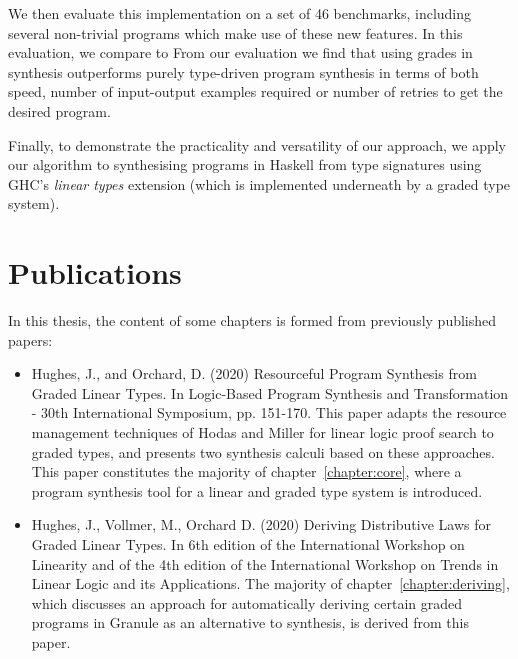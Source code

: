 We then evaluate this implementation on a set of 46 benchmarks, including
several non-trivial programs which make use of these new features. In this evaluation, 
we compare to 
From our evaluation we find that using grades in synthesis outperforms purely
type-driven program synthesis in terms of both speed, number of input-output
examples required or number of retries to get the desired program.

Finally, to demonstrate the practicality and versatility of our approach, we
apply our algorithm to synthesising programs in Haskell from type signatures
using GHC's \emph{linear types} extension (which is implemented underneath by a
graded type system).


\section{Publications}
In this thesis, the content of some chapters is formed from previously published papers:
\begin{itemize}
    \item Hughes, J., and Orchard, D. (2020) Resourceful Program Synthesis from
    Graded Linear Types. In Logic-Based Program Synthesis and Transformation -
    30th International Symposium, pp. 151-170. This paper adapts the resource
    management techniques of Hodas and Miller for linear logic proof search to
    graded types, and presents two synthesis calculi based on these approaches.
    This paper constitutes the majority of chapter~\ref{chapter:core}, where a
    program synthesis tool for a linear and graded type system is introduced. 
    \item Hughes, J., Vollmer, M., Orchard D. (2020) Deriving Distributive Laws
    for Graded Linear Types. In 6th edition of the International Workshop on
    Linearity and of the 4th edition of the International Workshop on Trends in
    Linear Logic and its Applications. The majority of
    chapter~\ref{chapter:deriving}, which discusses an approach for
    automatically deriving certain graded programs in Granule as an alternative
    to synthesis, is derived from this paper. 
\end{itemize}